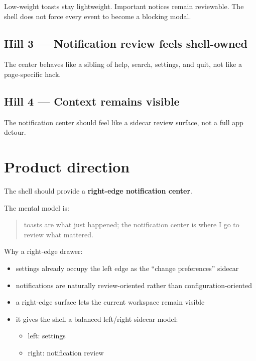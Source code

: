 Low-weight toasts stay lightweight. Important notices remain reviewable. The shell does not force every event to become a blocking modal.

\subsection{Hill 3 --- Notification review feels shell-owned}\label{record-053-hill-3-notification-review-feels-shell-owned}

The center behaves like a sibling of help, search, settings, and quit, not like a page-specific hack.

\subsection{Hill 4 --- Context remains visible}\label{record-053-hill-4-context-remains-visible}

The notification center should feel like a sidecar review surface, not a full app detour.

\section{Product direction}\label{record-053-product-direction}

The shell should provide a \textbf{right-edge notification center}.

The mental model is:

\begin{quote}
toasts are what just happened; the notification center is where I go to review what mattered.
\end{quote}

Why a right-edge drawer:

\begin{itemize}
\tightlist
\item
  settings already occupy the left edge as the ``change preferences'' sidecar
\item
  notifications are naturally review-oriented rather than configuration-oriented
\item
  a right-edge surface lets the current workspace remain visible
\item
  it gives the shell a balanced left/right sidecar model:

  \begin{itemize}
  \tightlist
  \item
    left: settings
  \item
    right: notification review
  \end{itemize}
\end{itemize}


